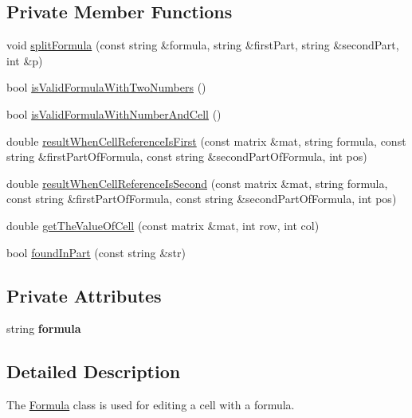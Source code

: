 \subsection*{Private Member Functions}
\begin{DoxyCompactItemize}
\item 
void \hyperlink{class_formula_ae9390fbc99e5ade644589b144c73bfb7}{split\+Formula} (const string \&formula, string \&first\+Part, string \&second\+Part, int \&p)
\item 
bool \hyperlink{class_formula_a0a2b13b0f741ea650e1ae71269dde9a5}{is\+Valid\+Formula\+With\+Two\+Numbers} ()
\item 
bool \hyperlink{class_formula_a83eff8c83a0ea79b3dd21c2e86a546c8}{is\+Valid\+Formula\+With\+Number\+And\+Cell} ()
\item 
double \hyperlink{class_formula_a9a27ccdd3ee3143b1f6e541ec3c6a0ec}{result\+When\+Cell\+Reference\+Is\+First} (const matrix \&mat, string formula, const string \&first\+Part\+Of\+Formula, const string \&second\+Part\+Of\+Formula, int pos)
\item 
double \hyperlink{class_formula_ae0edae33b4af295bab04f1f1c06f406f}{result\+When\+Cell\+Reference\+Is\+Second} (const matrix \&mat, string formula, const string \&first\+Part\+Of\+Formula, const string \&second\+Part\+Of\+Formula, int pos)
\item 
double \hyperlink{class_formula_a8080ff3cf8fce2d9f1730e772ae21c71}{get\+The\+Value\+Of\+Cell} (const matrix \&mat, int row, int col)
\item 
bool \hyperlink{class_formula_a79079cea46f8320cd7a63f576251baac}{found\+In\+Part} (const string \&str)
\end{DoxyCompactItemize}
\subsection*{Private Attributes}
\begin{DoxyCompactItemize}
\item 
\mbox{\label{class_formula_a2a3b5b998b48db1fadf57752e59ed4fb}} 
string {\bfseries formula}
\end{DoxyCompactItemize}


\subsection{Detailed Description}
The \hyperlink{class_formula}{Formula} class is used for editing a cell with a formula. 


